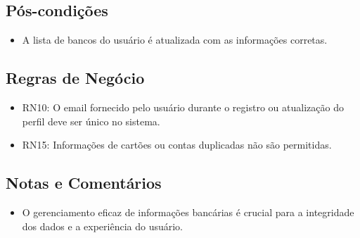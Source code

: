 \subsection*{Pós-condições}
\begin{addmargin}[1.5cm]{0cm}
    \begin{itemize}
        \item A lista de bancos do usuário é atualizada com as informações corretas.
    \end{itemize}
\end{addmargin}

\subsection*{Regras de Negócio}
\begin{addmargin}[1.5cm]{0cm}
    \begin{itemize}
        \item RN10: O email fornecido pelo usuário durante o registro ou atualização do perfil deve ser único no sistema.
        \item RN15: Informações de cartões ou contas duplicadas não são permitidas.
    \end{itemize}
\end{addmargin}

\subsection*{Notas e Comentários}
\begin{addmargin}[1.5cm]{0cm}
    \begin{itemize}
        \item O gerenciamento eficaz de informações bancárias é crucial para a integridade dos dados e a experiência do usuário.
    \end{itemize}
\end{addmargin}
